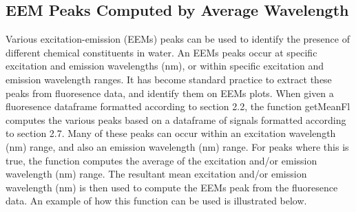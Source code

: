 \documentclass[a4paper,11pt]{article}\usepackage[]{graphicx}\usepackage[]{color}
\begin{document}
\subsection{EEM Peaks Computed by Average Wavelength}
Various excitation-emission (EEMs) peaks can be used to identify the presence of different chemical constituents in water. An EEMs peaks occur at specific excitation and emission wavelengths (nm), or within specific excitation and emission wavelength ranges. It has become standard practice to extract these peaks from fluoresence data, and identify them on EEMs plots. When given a fluoresence dataframe formatted according to section 2.2, the function getMeanFl computes the various peaks based on a dataframe of signals formatted according to section 2.7. Many of these peaks can occur within an excitation wavelength (nm) range, and also an emission wavelength (nm) range. For peaks where this is true, the function computes the average of the excitation and/or emission wavelength (nm) range. The resultant mean excitation and/or emission wavelength (nm) is then used to compute the EEMs peak from the fluoresence data. An example of how this function can be used is illustrated below.
\end{document}
